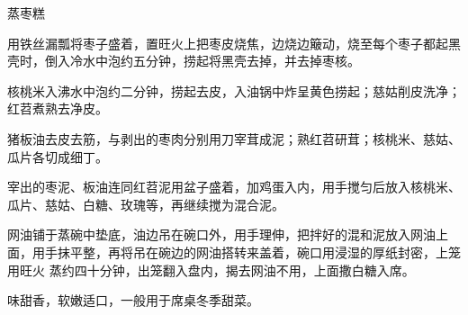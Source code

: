%
%
%
%
%
%
%
\begin{recipe}{蒸枣糕}

\ingredients


\preparation

\step 用铁丝漏瓢将枣子盛着，置旺火上把枣皮烧焦，边烧边簸动，烧至每个枣子都起黑
壳时，倒入冷水中泡约五分钟，捞起将黑壳去掉，并去掉枣核。

\step 核桃米入沸水中泡约二分钟，捞起去皮，入油锅中炸呈黄色捞起；慈姑削皮洗净；
红苕煮熟去净皮。

\step 猪板油去皮去筋，与剥出的枣肉分别用刀宰茸成泥；熟红苕研茸；核桃米、慈姑、
瓜片各切成细丁。

\step 宰出的枣泥、板油连同红苕泥用盆子盛着，加鸡蛋入内，用手搅匀后放入核桃米、
瓜片、慈姑、白糖、玫瑰等，再继续搅为混合泥。

\step 网油铺于蒸碗中垫底，油边吊在碗口外，用手理伸，把拌好的混和泥放入网油上
面，用手抹平整，再将吊在碗边的网油搭转来盖着，碗口用浸湿的厚纸封密，上笼用旺火
蒸约四十分钟，出笼翻入盘内，揭去网油不用，上面撒白糖入席。

\features

味甜香，软嫩适口，一般用于席桌冬季甜菜。

\end{recipe}


